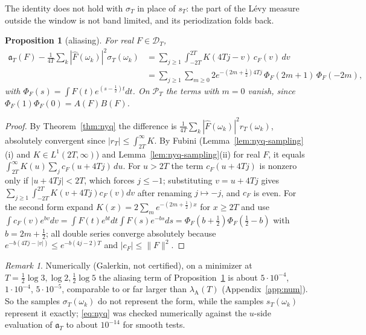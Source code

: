 \documentclass[11pt]{amsart}
\newtheorem{proposition}[theorem]{Proposition}
\theoremstyle{definition}
\theoremstyle{remark}
\newtheorem{remark}[theorem]{Remark}
\newcommand{\PT}{\mathcal P_T}
\newcommand{\lamA}{\lambda_{\mathrm A}(T)}
\newcommand{\sT}{\sigma_T}
\newcommand{\Fh}{\widehat F}
\newcommand{\cF}{c_F}
\begin{document}
The identity does not hold with $\sT$ in place of $s_T$: the part of the L\'evy measure outside the window is
not band limited, and its periodization folds back.

\begin{proposition}[aliasing]\label{prop:nyq-alias}
For real $F\in\mathcal D_T$,
\begin{align*}
\mathfrak a_T(F)-\frac1{4T}\sum_k|\Fh(\omega_k)|^2\sT(\omega_k)
&=\sum_{j\ge1}\int_{-2T}^{2T}K(4Tj-v)\,\cF(v)\,dv\\
&=\sum_{j\ge1}\sum_{m\ge0}2e^{-(2m+\frac12)4Tj}\,\Phi_F(2m+1)\,\Phi_F(-2m),
\end{align*}
with $\Phi_F(s)=\int F(t)e^{(s-\frac12)t}dt$. On $\PT$ the terms with $m=0$ vanish, since
$\Phi_F(1)\Phi_F(0)=A(F)B(F)$.
\end{proposition}

\begin{proof}
By Theorem~\ref{thm:nyq} the difference is $\frac1{4T}\sum_k|\Fh(\omega_k)|^2r_T(\omega_k)$, absolutely
convergent since $|r_T|\le\int_{2T}^\infty K$. By Fubini (Lemma~\ref{lem:nyq-sampling}(i) and
$K\in L^1(2T,\infty)$) and Lemma~\ref{lem:nyq-sampling}(ii) for real $F$, it equals
$\int_{2T}^\infty K(u)\sum_j\cF(u+4Tj)\,du$. For $u>2T$ the term $\cF(u+4Tj)$ is nonzero only if
$|u+4Tj|<2T$, which forces $j\le-1$; substituting $v=u+4Tj$ gives
$\sum_{j\ge1}\int_{-2T}^{2T}K(v+4Tj)\cF(v)dv$ after renaming $j\mapsto-j$, and $\cF$ is even. For the second form expand
$K(x)=2\sum_me^{-(2m+\frac12)x}$ for $x\ge2T$ and use $\int\cF(v)e^{bv}dv=\int F(t)e^{bt}dt\int F(s)e^{-bs}ds
=\Phi_F(b+\frac12)\Phi_F(\frac12-b)$ with $b=2m+\frac12$; all double series converge absolutely because
$e^{-b(4Tj-|v|)}\le e^{-b(4j-2)T}$ and $|\cF|\le\|F\|^2$.
\end{proof}

\begin{remark}\label{rem:nyq-num}
Numerically (Galerkin, not certified), on a minimizer at $T=\frac12\log3,\log2,\frac12\log5$ the aliasing term
of Proposition~\ref{prop:nyq-alias} is about $5\cdot10^{-4}$, $1\cdot10^{-4}$, $5\cdot10^{-5}$, comparable to or
far larger than $\lamA$ (Appendix~\ref{app:num}). So the samples $\sT(\omega_k)$ do not represent the form,
while the samples $s_T(\omega_k)$ represent it exactly; \eqref{eq:nyq} was checked numerically against the
$u$-side evaluation of $\mathfrak a_T$ to about $10^{-14}$ for smooth tests.
\end{remark}
\end{document}
